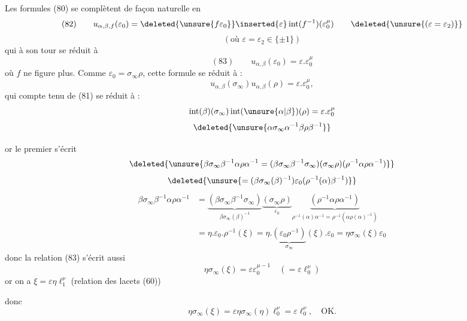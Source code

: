 Les formules (80) se complètent de façon naturelle en
\[
(82)\qquad
u_{\alpha,\beta,f}(\varepsilon_0)
=\deleted{\unsure{f\varepsilon_0}}\inserted{\varepsilon}\operatorname{int}(f^{-1})(\varepsilon_0^\mu)
\qquad\deleted{\unsure{(\varepsilon=\varepsilon_2)}}
\]
\[
(\text{où }\varepsilon=\varepsilon_2\in\{\pm1\})
\]
qui à son tour se réduit à
\[
(83)\qquad u_{\alpha,\beta}(\varepsilon_0)=\varepsilon.\varepsilon_0^\mu
\]
où $f$ ne figure plus. Comme $\varepsilon_0=\sigma_\infty\rho$, cette formule se réduit à :
\[
u_{\alpha,\beta}(\sigma_\infty)u_{\alpha,\beta}(\rho)=\varepsilon.\varepsilon_0^\mu,
\]
qui compte tenu de (81) se réduit à :
\[
\operatorname{int}(\beta)(\sigma_\infty)\operatorname{int}(\unsure{\alpha|\beta})(\rho)=\varepsilon.\varepsilon_0^\mu
\]
\[
\deleted{\unsure{\alpha\sigma_\infty\alpha^{-1}\beta\rho\beta^{-1}}}
\]


or le premier  s'écrit
\[
\deleted{\unsure{\beta\sigma_\infty\beta^{-1}\alpha\rho\alpha^{-1}
=(\beta\sigma_\infty\beta^{-1}\sigma_\infty)(\sigma_\infty\rho)(\rho^{-1}\alpha\rho\alpha^{-1})}}
\]
\[
\deleted{\unsure{=(\beta\sigma_\infty(\beta)^{-1})\varepsilon_0(\rho^{-1}(\alpha)\beta^{-1})}}
\]
\[
\begin{aligned}
\beta\sigma_\infty\beta^{-1}\alpha\rho\alpha^{-1}
&=\underbrace{(\beta\sigma_\infty\beta^{-1}\sigma_\infty)}_{\beta\sigma_\infty(\beta)^{-1}}
\underbrace{(\sigma_\infty\rho)}_{\varepsilon_0}
\underbrace{(\rho^{-1}\alpha\rho\alpha^{-1})}_{\rho^{-1}(\alpha)\alpha^{-1}=\rho^{-1}(\alpha\rho(\alpha)^{-1})}\\
&=\eta.\varepsilon_0.\rho^{-1}(\xi)
=\eta.\underbrace{(\varepsilon_0\rho^{-1})}_{\sigma_\infty}(\xi).\varepsilon_0
=\eta\sigma_\infty(\xi)\varepsilon_0
\end{aligned}
\]
donc la relation (83) s'écrit aussi
\[
\eta\sigma_\infty(\xi)=\varepsilon\varepsilon_0^{\mu-1}\quad(=\varepsilon \ell_0^\nu)
\]
or on a $\xi=\varepsilon\eta \ell_1^\nu$ (relation des lacets (60))

donc
\[
\eta\sigma_\infty(\xi)=\varepsilon\eta\sigma_\infty(\eta)\ell_0^\nu=\varepsilon \ell_0^\nu,\quad\text{OK.}
\]

